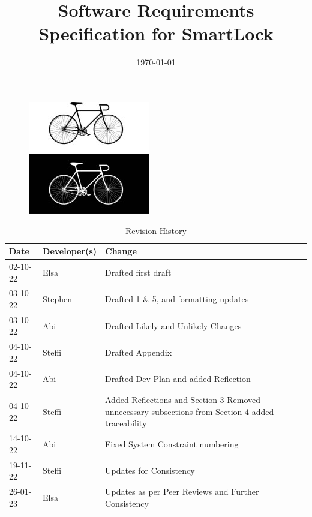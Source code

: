 \documentclass[12pt]{article}
\begin{document}
\title{Software Requirements Specification for SmartLock\\\progname} 
\author{\authname}
\date{\today}
	
\maketitle
\thispagestyle{empty}
\begin{figure}[h!]
  \centering
  \includegraphics[width=0.4\linewidth]{../BikeLogo.jpg}
\end{figure}

\newpage
{}
\begin{table}[hp]
\caption{Revision History} \label{TblRevisionHistory}
\begin{tabularx}{\textwidth}{llX}
\toprule
\textbf{Date} & \textbf{Developer(s)} & \textbf{Change}\\
\midrule
02-10-22 & Elsa & Drafted first draft\\
03-10-22 & Stephen & Drafted 1 \& 5, and formatting updates\\
03-10-22 & Abi & Drafted Likely and Unlikely Changes\\
04-10-22 & Steffi & Drafted Appendix\\
04-10-22 & Abi & Drafted Dev Plan and added Reflection\\
04-10-22 & Steffi & Added Reflections and Section 3 Removed unnecessary subsections from Section 4 added traceability\\
14-10-22 & Abi & Fixed System Constraint numbering\\
19-11-22 & Steffi & Updates for Consistency\\
26-01-23 & Elsa & Updates as per Peer Reviews and Further Consistency\\
\bottomrule
\end{tabularx}
\end{table}

\newpage


\tableofcontents
\end{document}
